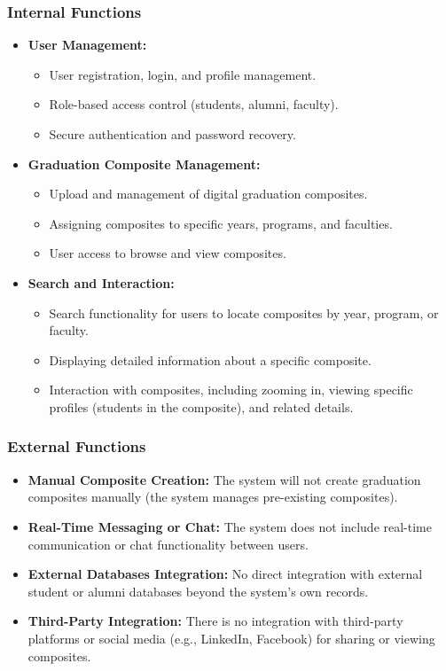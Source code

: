 \documentclass[12pt]{article}
\begin{document}
\subsubsection*{Internal Functions}
\begin{itemize}
  \item \textbf{User Management:}
  \begin{itemize}
    \item User registration, login, and profile management.
    \item Role-based access control (students, alumni, faculty).
    \item Secure authentication and password recovery.
  \end{itemize}

  \item \textbf{Graduation Composite Management:}
  \begin{itemize}
    \item Upload and management of digital graduation composites.
    \item Assigning composites to specific years, programs, and faculties.
    \item User access to browse and view composites.
  \end{itemize}

  \item \textbf{Search and Interaction:}
  \begin{itemize}
    \item Search functionality for users to locate composites by year, program, or faculty.
    \item Displaying detailed information about a specific composite.
    \item Interaction with composites, including zooming in, viewing specific profiles (students in the composite), and related details.
  \end{itemize}
\end{itemize}

\subsubsection*{External Functions}
\begin{itemize}
  \item \textbf{Manual Composite Creation:} The system will not create graduation composites manually (the system manages pre-existing composites).
  \item \textbf{Real-Time Messaging or Chat:} The system does not include real-time communication or chat functionality between users.
  \item \textbf{External Databases Integration:} No direct integration with external student or alumni databases beyond the system’s own records.
  \item \textbf{Third-Party Integration:} There is no integration with third-party platforms or social media (e.g., LinkedIn, Facebook) for sharing or viewing composites.
\end{itemize}
\end{document}
